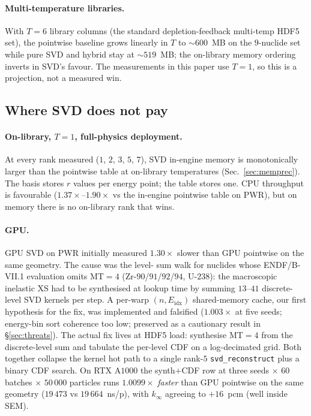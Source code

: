 \paragraph{Multi-temperature libraries.}
With $T = 6$ library columns (the standard
depletion-feedback multi-temp HDF5 set), the pointwise
baseline grows linearly in $T$ to $\sim\!600$~MB on the
$9$-nuclide set while pure SVD and hybrid stay at
$\sim\!519$~MB; the on-library memory ordering inverts
in SVD's favour. The measurements in this paper use
$T = 1$, so this is a projection, not a measured win.

\subsection{Where SVD does not pay}
\label{sec:where_not}

\paragraph{On-library, $T = 1$, full-physics deployment.}
At every rank measured ($1$, $2$, $3$, $5$, $7$), SVD
in-engine memory is monotonically larger than the
pointwise table at on-library temperatures
(Sec.~\ref{sec:memprec}). The basis stores $r$ values per
energy point; the table stores one. CPU throughput is
favourable ($1.37\times$--$1.90\times$ vs the in-engine
pointwise table on PWR), but on memory there is no
on-library rank that wins.

\paragraph{GPU.}
GPU SVD on PWR initially measured $1.30\times$ slower than
GPU pointwise on the same geometry. The cause was the level-
sum walk for nuclides whose ENDF/B-VII.1 evaluation omits
MT$=4$ (Zr-$90$/$91$/$92$/$94$, U-$238$): the macroscopic
inelastic XS had to be synthesised at lookup time by summing
$13$--$41$ discrete-level SVD kernels per step. A per-warp
$(n, E_\text{idx})$ shared-memory cache, our first hypothesis
for the fix, was implemented and falsified ($1.003\times$ at
five seeds; energy-bin sort coherence too low; preserved as a
cautionary result in §\ref{sec:threats}). The actual fix
lives at HDF5 load: synthesise MT$=4$ from the discrete-level
sum and tabulate the per-level CDF on a log-decimated grid.
Both together collapse the kernel hot path to a single
rank-$5$ \texttt{svd\_reconstruct} plus a binary CDF search.
On RTX A$1000$ the synth$+$CDF row at three seeds $\times$
$60$ batches $\times$ $50\,000$ particles runs $1.0099\times$
\emph{faster} than GPU pointwise on the same geometry
($19\,473$ vs $19\,664$~ns/p), with $k_\infty$ agreeing to
$+16$~pcm (well inside SEM).

